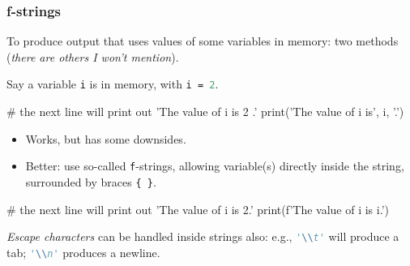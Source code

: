 \documentclass{beamer}
\newenvironment{codeblock}
    {\hfill\begin{beamerboxesrounded}[lower=codecol, width=0.8\textwidth]
    \medskip

    }
    { 
    \end{beamerboxesrounded}\hfill
    }
\theoremstyle{example}
\newcommand{\ct}[1]{\lstinline[language=Python]!#1!}
\newcommand{\ttt}[1]{\texttt{#1}}
\begin{document}
\begin{frame}[fragile]
\frametitle{{\ttb f}-strings}

To produce output that uses values of some variables in memory: two methods (\emph{there are others I won't mention}).

\pause
Say a variable \ttt{i} is in memory, with \ttt{i = }\ct{2}.

\pause
\begin{codeblock}

\begin{python}
# the next line will print out 'The value of i is 2 .'
print('The value of i is', i, '.')
\end{python}

\end{codeblock}

\begin{itemize}
	\item Works, but has some downsides. 
	\pause
	\item Better: use so-called \ttt{f}-strings, allowing variable(s) directly inside the string, surrounded by braces \ttt{\{ \}}.
\end{itemize}

\begin{codeblock}

\begin{python}
# the next line will print out 'The value of i is 2.'
print(f'The value of i is {i}.')
\end{python}

\end{codeblock}

\pause
\emph{Escape characters} can be handled inside strings also: e.g., \ct{'\\t'} will produce a tab; \ct{'\\n'} produces a newline.

\end{frame}
\end{document}
